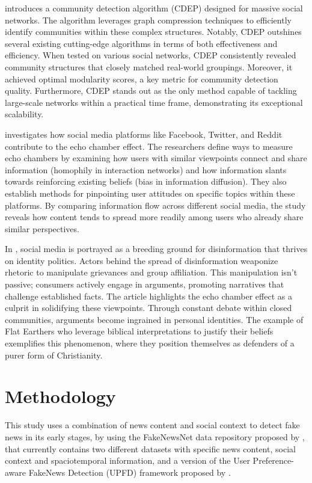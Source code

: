 \documentclass[12pt]{article}
\begin{document}
\cite{ZHAO2021358} introduces a community detection algorithm (CDEP) designed for massive social networks.
The algorithm leverages graph compression techniques to efficiently identify communities within these complex structures.
Notably, CDEP outshines several existing cutting-edge algorithms in terms of both effectiveness and efficiency.
When tested on various social networks, CDEP consistently revealed community structures that
closely matched real-world groupings. Moreover, it achieved optimal modularity scores, a key metric for
community detection quality.  Furthermore, CDEP stands out as the only method capable of tackling large-scale
networks within a practical time frame, demonstrating its exceptional scalability.

\cite{Cinelli_2021} investigates how social media platforms like Facebook, Twitter, and Reddit contribute to the echo chamber effect.
The researchers define ways to measure echo chambers by examining how users with similar viewpoints connect and share information
(homophily in interaction networks) and how information slants towards reinforcing existing beliefs (bias in information diffusion).
They also establish methods for pinpointing user attitudes on specific topics within these platforms.
By comparing information flow across different social media, the study reveals how content
tends to spread more readily among users who already share similar perspectives.

In \cite{Diaz_2023}, social media is portrayed as a breeding ground for disinformation that thrives on identity politics.
Actors behind the spread of disinformation weaponize rhetoric to manipulate grievances and group affiliation.
This manipulation isn't passive; consumers actively engage in arguments, promoting narratives that challenge established facts.
The article highlights the echo chamber effect as a culprit in solidifying these viewpoints.
Through constant debate within closed communities, arguments become ingrained in personal identities.
The example of Flat Earthers who leverage biblical interpretations to justify their beliefs exemplifies this phenomenon,
where they position themselves as defenders of a purer form of Christianity.

\section{Methodology}

This study uses a combination of news content and social context to detect fake news in its early stages, 
by using the FakeNewsNet data repository proposed by \cite{shu2019fakenewsnet}, 
that currently contains two different datasets with specific news content, social context and
spaciotemporal information, and a version of the User Preference-aware FakeNews Detection (UPFD) framework
proposed by \cite{dou2021user}.  
\end{document}
